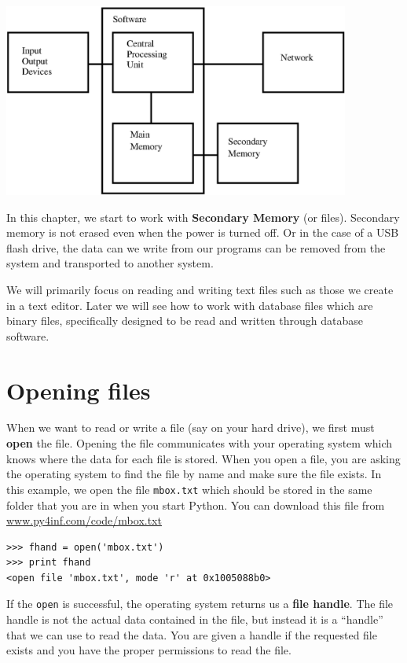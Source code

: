 \documentclass[10pt]{book}
\begin{document}
\beforefig
\centerline{\includegraphics[height=2.50in]{figs2/arch3.eps}}
\afterfig

In this chapter, we start to work with {\bf Secondary Memory} 
(or files).
Secondary memory is not erased even when the power is turned off.  
Or in the case of a USB flash drive, the
data can we write from our programs can be removed from the 
system and transported to another system.

We will primarily focus on reading and writing text files such as 
those we create in a text editor.  Later we will see how to work
with database files which are binary files, specifically designed to be read
and written through database software.

\section{Opening files}

When we want to read or write a file (say on your hard drive), we first
must {\bf open} the file.  Opening the file communicates with your operating
system which knows where the data for each file is stored.  When you open
a file, you are asking the operating system to find the file by name
and make sure the file exists.  In this example, we open the file 
{\tt mbox.txt} which should be stored in the same folder that you
are in when you 
start Python.
You can download this file from 
\url{www.py4inf.com/code/mbox.txt}

\beforeverb
\begin{verbatim}
>>> fhand = open('mbox.txt')
>>> print fhand
<open file 'mbox.txt', mode 'r' at 0x1005088b0>
\end{verbatim}
\afterverb
%
If the {\tt open} is successful, the operating system returns us a 
{\bf file handle}.  The file handle is not the actual data contained
in the file, but instead it is a ``handle'' that we can use to 
read the data.   You are given a handle if the requested file
exists and you have the proper permissions to read the file.
\end{document}
